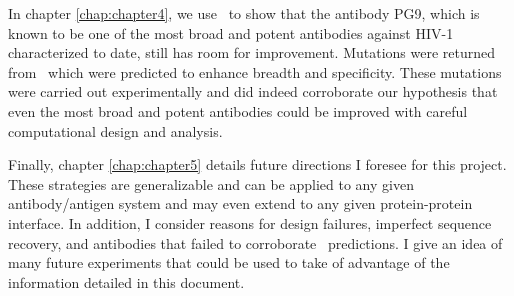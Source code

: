 In chapter \ref{chap:chapter4}, we use \rosettadesign~to show that the antibody PG9, which is known to be one of the most broad and potent antibodies against HIV-1 characterized to date, still has room for improvement. Mutations were returned from \rosettadesign~which were predicted to enhance breadth and specificity. These mutations were carried out experimentally and did indeed corroborate our hypothesis that even the most broad and potent antibodies could be improved with careful computational design and analysis.

Finally, chapter \ref{chap:chapter5} details future directions I foresee for this project. These strategies are generalizable and can be applied to any given antibody/antigen system and may even extend to any given protein-protein interface. In addition, I consider reasons for design failures, imperfect sequence recovery, and antibodies that failed to corroborate \silico~predictions. I give an idea of many future experiments that could be used to take of advantage of the information detailed in this document.
